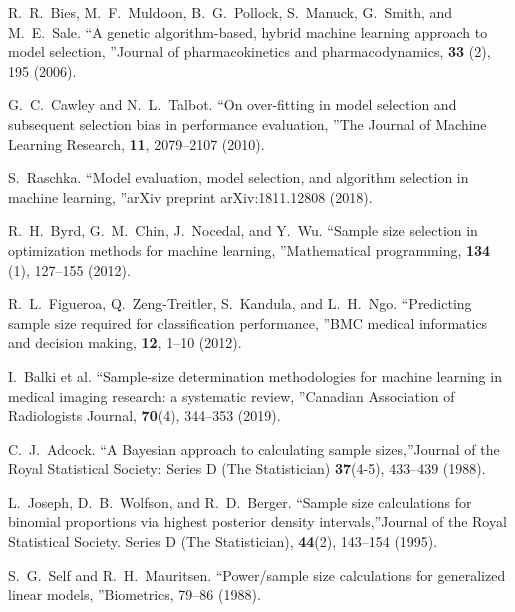\documentclass[
11pt,%
tightenlines,%
twoside,%
onecolumn,%
nofloats,%
nobibnotes,%
nofootinbib,%
superscriptaddress,%
noshowpacs,%
centertags]%
{revtex4-2}
\begin{document}
\begin{thebibliography}{99}

R.~R.~Bies, M.~F.~Muldoon, B.~G.~Pollock, S.~Manuck, G.~Smith, and M.~E.~Sale. \textquotedblleft A genetic algorithm-based, hybrid machine learning approach to model selection, \textquotedblright Journal of pharmacokinetics and pharmacodynamics, \textbf{33} (2), 195 (2006).

G.~C.~Cawley and N.~L.~Talbot. \textquotedblleft On over-fitting in model selection and subsequent selection bias in performance evaluation, \textquotedblright The Journal of Machine Learning Research, \textbf{11}, 2079--2107 (2010).

S.~Raschka. \textquotedblleft Model evaluation, model selection, and algorithm selection in machine learning, \textquotedblright arXiv preprint arXiv:1811.12808 (2018).

R.~H.~Byrd, G.~M.~Chin, J.~Nocedal, and Y.~Wu. \textquotedblleft Sample size selection in optimization methods for machine learning, \textquotedblright Mathematical programming, \textbf{134} (1), 127--155 (2012).

R.~L.~Figueroa, Q.~Zeng-Treitler, S.~Kandula, and L.~H.~Ngo. \textquotedblleft Predicting sample size required for classification performance, \textquotedblright BMC medical informatics and decision making, \textbf{12}, 1--10 (2012).

I.~Balki et al. \textquotedblleft Sample-size determination methodologies for machine learning in medical imaging research: a systematic review, \textquotedblright Canadian Association of Radiologists Journal, \textbf{70}(4), 344--353 (2019).

C.~J.~Adcock. \textquotedblleft A Bayesian approach to calculating sample sizes,\textquotedblright Journal of the Royal Statistical Society: Series D (The Statistician) \textbf{37}(4-5), 433--439 (1988).

L.~Joseph, D.~B.~Wolfson, and R.~D.~Berger. \textquotedblleft Sample size calculations for binomial proportions via highest posterior density intervals,\textquotedblright Journal of the Royal Statistical Society. Series D (The Statistician), \textbf{44}(2), 143--154 (1995).

S.~G.~Self and R.~H.~Mauritsen. \textquotedblleft Power/sample size calculations for generalized linear models, \textquotedblright Biometrics, 79--86 (1988).


\end{thebibliography}
\end{document}

